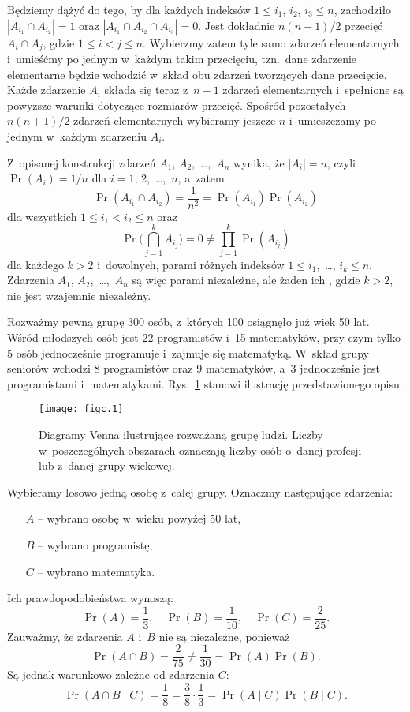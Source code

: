 Będziemy dążyć do tego, by dla każdych indeksów $1\le i_1$, $i_2$, $i_3\le n$, zachodziło $|A_{i_1}\cap A_{i_2}|=1$ oraz $|A_{i_1}\cap A_{i_2}\cap A_{i_3}|=0$. Jest dokładnie $n(n-1)/2$ przecięć $A_i\cap A_j$, gdzie $1\le i<j\le n$. Wybierzmy zatem tyle samo zdarzeń elementarnych i~umieśćmy po jednym w~każdym takim przecięciu, tzn.\ dane zdarzenie elementarne będzie wchodzić w~skład obu zdarzeń tworzących dane przecięcie. Każde zdarzenie $A_i$ składa się teraz z~$n-1$ zdarzeń elementarnych i~spełnione są powyższe warunki dotyczące rozmiarów przecięć. Spośród pozostałych $n(n+1)/2$ zdarzeń elementarnych wybieramy jeszcze $n$ i~umieszczamy po jednym w~każdym zdarzeniu $A_i$.

Z~opisanej konstrukcji zdarzeń $A_1$, $A_2$,~\dots,~$A_n$ wynika, że $|A_i|=n$, czyli $\Pr(A_i)=1/n$ dla $i=1$, 2,~\dots,~$n$, a~zatem
\[
	\Pr(A_{i_1}\cap A_{i_2}) = \frac{1}{n^2} = \Pr(A_{i_1})\Pr(A_{i_2})
\]
dla wszystkich $1\le i_1<i_2\le n$ oraz
\[
	\Pr\biggl(\bigcap_{j=1}^kA_{i_j}\biggr) = 0 \ne \prod_{j=1}^k\Pr(A_{i_j})
\]
dla każdego $k>2$ i~dowolnych, parami różnych indeksów $1\le i_1$,~\dots, $i_k\le n$. Zdarzenia $A_1$, $A_2$,~\dots,~$A_n$ są więc parami niezależne, ale żaden ich , gdzie $k>2$, nie jest wzajemnie niezależny.

\exercise %
Rozważmy pewną grupę 300 osób, z~których 100 osiągnęło już wiek 50 lat. Wśród młodszych osób jest 22 programistów i~15 matematyków, przy czym tylko 5 osób jednocześnie programuje i~zajmuje się matematyką. W~skład grupy seniorów wchodzi 8 programistów oraz 9 matematyków, a~3 jednocześnie jest programistami i~matematykami. Rys.~\ref{fig:C.2-8} stanowi ilustrację przedstawionego opisu.
\begin{figure}[ht]
	\begin{center}
		\texttt{[image: figc.1]}
	\end{center}
	\caption{Diagramy Venna ilustrujące rozważaną grupę ludzi. Liczby w~poszczególnych obszarach oznaczają liczby osób o~danej profesji lub z~danej grupy wiekowej.} \label{fig:C.2-8}
\end{figure}

Wybieramy losowo jedną osobę z~całej grupy. Oznaczmy następujące zdarzenia:
\begin{itemize}
	\item[$A$] -- wybrano osobę w~wieku powyżej 50 lat,
	\item[$B$] -- wybrano programistę,
	\item[$C$] -- wybrano matematyka.
\end{itemize}
Ich prawdopodobieństwa wynoszą:
\[
	\Pr(A) = \frac{1}{3}, \quad \Pr(B) = \frac{1}{10}, \quad \Pr(C) = \frac{2}{25}.
\]
Zauważmy, że zdarzenia $A$ i~$B$ nie są niezależne, ponieważ
\[
	\Pr(A\cap B) = \frac{2}{75} \ne \frac{1}{30} = \Pr(A)\Pr(B).
\]
Są jednak warunkowo zależne od zdarzenia $C$:
\[
	\Pr(A\cap B\mid C) = \frac{1}{8} = \frac{3}{8}\cdot\frac{1}{3} = \Pr(A\mid C)\Pr(B\mid C).
\]

